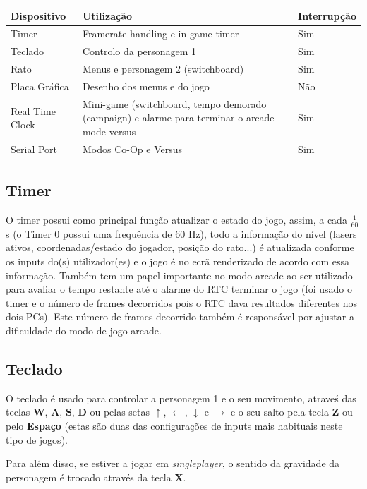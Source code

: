\documentclass{report}
\begin{document}
\begin{center}
	\begin{tabular}{|p{3cm}|p{8cm}|p{2cm}|} 
		\hline
			Dispositivo & Utilização & Interrupção \\ 
		\hline
		\hline
			Timer & Framerate handling e in-game timer  & Sim \\ 
			Teclado & Controlo da personagem 1 & Sim \\ 
			Rato & Menus e personagem 2 (switchboard) & Sim\\
			Placa Gráfica & Desenho dos menus e do jogo & Não\\
			Real Time Clock & Mini-game (switchboard, tempo demorado (campaign) e alarme para terminar o arcade mode versus & Sim\\
			Serial Port & Modos Co-Op e Versus & Sim \\
		\hline
	\end{tabular}
\end{center}

\subsection{Timer}

O timer possui como principal função atualizar o estado do jogo, assim, a cada $\frac{1}{60}$s (o Timer 0 possui uma frequência de 60 Hz), todo a informação do nível (lasers ativos, coordenadas/estado do jogador, posição do rato...) é atualizada conforme os inputs do(s) utilizador(es) e o jogo é no ecrã renderizado de acordo com essa informação.
Também tem um papel importante no modo arcade ao ser utilizado para avaliar o tempo restante até o alarme do RTC terminar o jogo (foi usado o timer e o número de frames decorridos pois o RTC dava resultados diferentes nos dois PCs). Este número de frames decorrido também é responsável por ajustar a dificuldade do modo de jogo arcade.

\subsection{Teclado}

O teclado é usado para controlar a personagem 1 e o seu movimento, atraveś das teclas \textbf{W}, \textbf{A}, \textbf{S}, \textbf{D} ou pelas setas $\uparrow$, $\leftarrow$, $\downarrow$ e $\rightarrow$ e o seu salto pela tecla \textbf{Z} ou pelo \textbf{Espaço} (estas são duas das configurações de inputs mais habituais neste tipo de jogos).

Para além disso, se estiver a jogar em \textit{singleplayer}, o sentido da gravidade da personagem é trocado através da tecla \textbf{X}.
\end{document}
